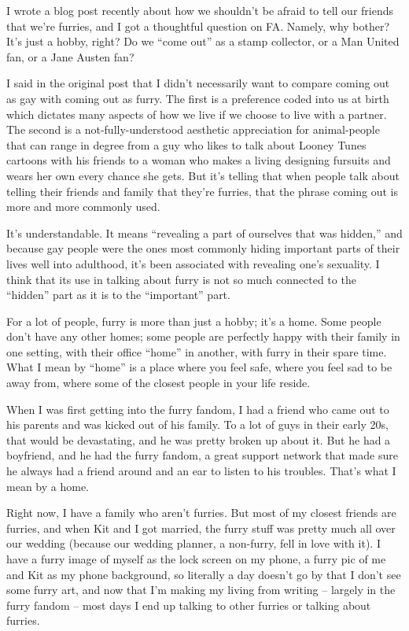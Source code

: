 
I wrote a blog post recently about how we shouldn't be afraid to tell our friends that we're furries, and I got a thoughtful question on FA. Namely, why bother? It's just a hobby, right? Do we ``come out'' as a stamp collector, or a Man United fan, or a Jane Austen fan?

I said in the original post that I didn't necessarily want to compare coming out as gay with coming out as furry. The first is a preference coded into us at birth which dictates many aspects of how we live if we choose to live with a partner. The second is a not-fully-understood aesthetic appreciation for animal-people that can range in degree from a guy who likes to talk about Looney Tunes cartoons with his friends to a woman who makes a living designing fursuits and wears her own every chance she gets. But it's telling that when people talk about telling their friends and family that they're furries, that the phrase coming out is more and more commonly used.

It's understandable. It means ``revealing a part of ourselves that was hidden,'' and because gay people were the ones most commonly hiding important parts of their lives well into adulthood, it's been associated with revealing one's sexuality. I think that its use in talking about furry is not so much connected to the ``hidden'' part as it is to the ``important'' part.

For a lot of people, furry is more than just a hobby; it's a home. Some people don't have any other homes; some people are perfectly happy with their family in one setting, with their office ``home'' in another, with furry in their spare time. What I mean by ``home'' is a place where you feel safe, where you feel sad to be away from, where some of the closest people in your life reside.

When I was first getting into the furry fandom, I had a friend who came out to his parents and was kicked out of his family. To a lot of guys in their early 20s, that would be devastating, and he was pretty broken up about it. But he had a boyfriend, and he had the furry fandom, a great support network that made sure he always had a friend around and an ear to listen to his troubles. That's what I mean by a home.

Right now, I have a family who aren't furries. But most of my closest friends are furries, and when Kit and I got married, the furry stuff was pretty much all over our wedding (because our wedding planner, a non-furry, fell in love with it). I have a furry image of myself as the lock screen on my phone, a furry pic of me and Kit as my phone background, so literally a day doesn't go by that I don't see some furry art, and now that I'm making my living from writing -- largely in the furry fandom -- most days I end up talking to other furries or talking about furries.

